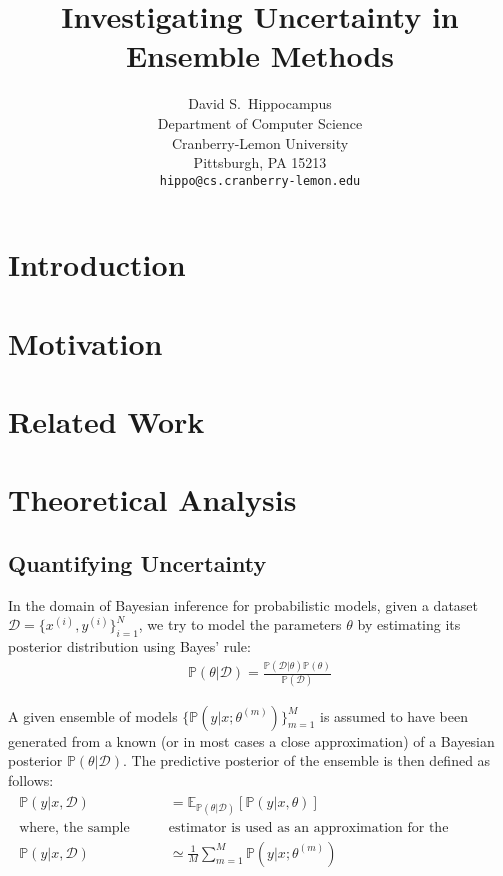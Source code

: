 \documentclass{article}
\title{Investigating Uncertainty in Ensemble Methods}
\author{%
  David S.~Hippocampus \\
  Department of Computer Science\\
  Cranberry-Lemon University\\
  Pittsburgh, PA 15213 \\
  \texttt{hippo@cs.cranberry-lemon.edu} \\
}
\begin{document}
\maketitle


\begin{abstract}
\end{abstract}


\section{Introduction}


\section{Motivation}


\section{Related Work}


\section{Theoretical Analysis}

\subsection{Quantifying Uncertainty}

In the domain of Bayesian inference for probabilistic models, given a dataset $\mathcal{D} = \{ x^{(i)}, y^{(i)}\}_{i=1}^N$, we try to model the parameters $\theta$ by estimating its posterior distribution using Bayes' rule:
\begin{align}
	\mathbb{P}(\theta|\mathcal{D}) = \frac{\mathbb{P}(\mathcal{D} | \theta)\mathbb{P}(\theta)}{\mathbb{P}(\mathcal{D})}
\end{align}

A given ensemble of models $\{ \mathbb{P}(y|x; \theta^{(m)}) \}_{m=1}^M$ is assumed to have been generated from a known (or in most cases a close approximation) of a Bayesian posterior $\mathbb{P}(\theta|\mathcal{D})$. The predictive posterior of the ensemble is then defined as follows:
\begin{align}
	\begin{split}
		\mathbb{P}(y|x, \mathcal{D}) &= \mathbb{E}_{\mathbb{P}(\theta|\mathcal{D})} \left[ \mathbb{P}(y|x,\theta) \right] \\
		\text{where, the sample mean}  &\text{estimator is used as an approximation for the expectation}\\
		\mathbb{P}(y|x, \mathcal{D}) &\simeq \frac{1}{M} \sum\limits_{m=1}^M \mathbb{P}(y|x; \theta^{(m)})
	\end{split}
\end{align}
\end{document}
